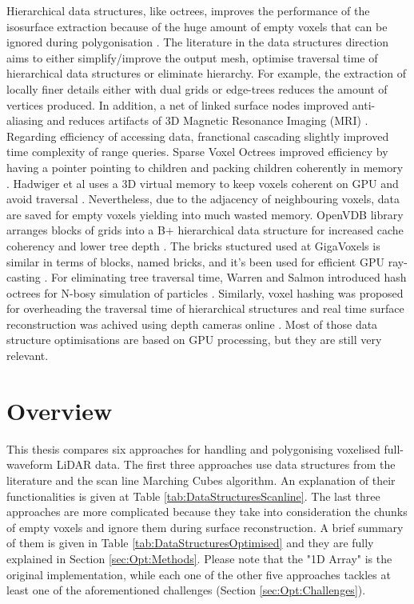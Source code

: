 \documentclass{subfiles}
\begin{document}
\par {\color{blue}Hierarchical data structures, like octrees, improves the performance of the isosurface extraction because of the huge amount of empty voxels that can be ignored during polygonisation \cite{Wilhelms1990}. The literature in the data structures direction aims to either simplify/improve the output mesh, optimise traversal time of hierarchical data structures or eliminate hierarchy. For example, the extraction of locally finer details either with dual grids \cite{Scott2005} or edge-trees \cite{Wilhelms1992} reduces the amount of vertices produced. In addition, a net of linked surface nodes improved anti-aliasing and reduces artifacts of 3D Magnetic Resonance Imaging (MRI) \cite{Gibson1998}. Regarding efficiency of accessing data, } franctional cascading slightly improved time complexity of range queries\cite{Chazelle1986}. Sparse Voxel Octrees improved efficiency by having a pointer pointing to children and packing children coherently in memory \cite{Laine2011SparseOctrees}. Hadwiger et al uses a 3D virtual memory to keep voxels coherent on GPU and avoid traversal \cite{Hadwiger2012}. Nevertheless, due to the adjacency of neighbouring voxels, data are saved for empty voxels yielding into much wasted memory. OpenVDB library arranges blocks of grids into a B+ hierarchical data structure for increased cache coherency and lower tree depth \cite{Museth2013OpenVDB}. The bricks stuctured used at GigaVoxels is similar in terms of blocks, named bricks, and it's been used for efficient GPU ray-casting \cite{Crassin2009}. For eliminating tree traversal time, Warren and Salmon introduced hash octrees for N-bosy simulation of particles \cite{Warren1993hashedOctree}. Similarly, voxel hashing was proposed for overheading the traversal time of hierarchical structures and real time surface reconstruction was achived using depth cameras online \cite{Nievner2016voxelHashing}. Most of those data structure optimisations are based on GPU processing, but they are still very relevant.


\section{Overview}

{\color{blue}

\par This thesis compares six approaches for handling and polygonising voxelised full-waveform LiDAR data. The first three approaches use data structures from the literature and the scan line Marching Cubes algorithm. An explanation of their functionalities is given at Table \ref{tab:DataStructuresScanline}. The last three approaches are more complicated because they take into consideration the chunks of empty voxels and ignore them during surface reconstruction. A brief summary of them is given in Table \ref{tab:DataStructuresOptimised} and they are fully explained in Section \ref{sec:Opt:Methods}. Please note that the "1D Array" is the original implementation, while each one of the other five approaches tackles at least one of the aforementioned challenges (Section \ref{sec:Opt:Challenges}). 

}
\end{document}
